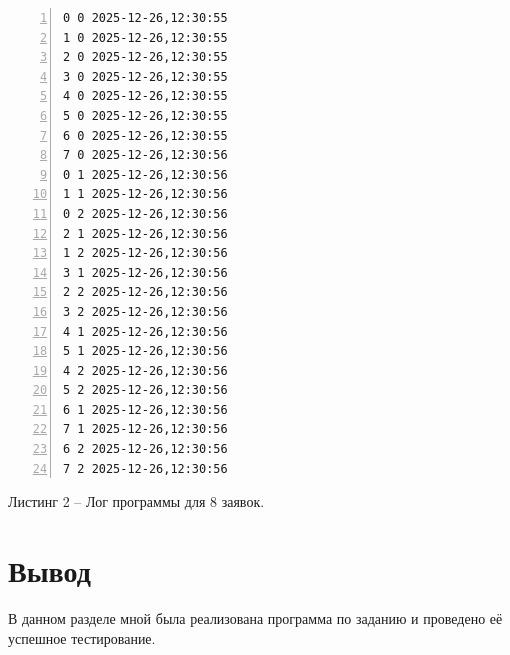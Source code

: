 \noindent
\begin{minipage}{\textwidth}\scriptsize
\begin{Verbatim}[frame=single, numbers=left, numbersep=2pt, commandchars=\\\{\}]
0 0 2025-12-26,12:30:55
1 0 2025-12-26,12:30:55
2 0 2025-12-26,12:30:55
3 0 2025-12-26,12:30:55
4 0 2025-12-26,12:30:55
5 0 2025-12-26,12:30:55
6 0 2025-12-26,12:30:55
7 0 2025-12-26,12:30:56
0 1 2025-12-26,12:30:56
1 1 2025-12-26,12:30:56
0 2 2025-12-26,12:30:56
2 1 2025-12-26,12:30:56
1 2 2025-12-26,12:30:56
3 1 2025-12-26,12:30:56
2 2 2025-12-26,12:30:56
3 2 2025-12-26,12:30:56
4 1 2025-12-26,12:30:56
5 1 2025-12-26,12:30:56
4 2 2025-12-26,12:30:56
5 2 2025-12-26,12:30:56
6 1 2025-12-26,12:30:56
7 1 2025-12-26,12:30:56
6 2 2025-12-26,12:30:56
7 2 2025-12-26,12:30:56
\end{Verbatim}
\end{minipage}

\vspace{0.5cm}
\noindent Листинг 2 -- Лог программы для 8 заявок.

\section*{Вывод}

В данном разделе мной была реализована программа по заданию и проведено её успешное тестирование.

\clearpage
